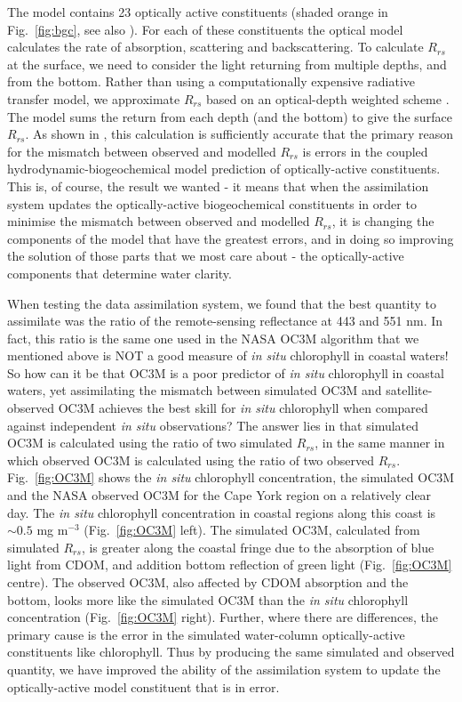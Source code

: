 The model contains 23 optically active constituents (shaded orange in Fig.~\ref{fig:bgc}, see also
\citet{Baird16a}). For each of these constituents the optical model calculates the rate of
absorption, scattering and backscattering. To calculate $R_{rs}$ at the surface, we need to consider
the light returning from multiple depths, and from the bottom. Rather than using a computationally
expensive radiative transfer model, we approximate $R_{rs}$ based on an optical-depth weighted
scheme \citep{Baird16a}. The model sums the return from each depth (and the bottom) to give the
surface $R_{rs}$. As shown in \citet{Baird16a}, this calculation is sufficiently accurate that the
primary reason for the mismatch between observed and modelled $R_{rs}$ is errors in the coupled
hydrodynamic-biogeochemical model prediction of optically-active constituents. This is, of course,
the result we wanted - it means that when the assimilation system updates the optically-active
biogeochemical constituents in order to minimise the mismatch between observed and modelled
$R_{rs}$, it is changing the components of the model that have the greatest errors, and in doing so
improving the solution of those parts that we most care about - the optically-active components that
determine water clarity.

When testing the data assimilation system, we found that the best quantity to assimilate was the
ratio of the remote-sensing reflectance at 443 and 551 nm. In fact, this ratio is the same one used
in the NASA OC3M algorithm that we mentioned above is NOT a good measure of \textit{in situ}
chlorophyll in coastal waters! So how can it be that OC3M is a poor predictor of \textit{in situ}
chlorophyll in coastal waters, yet assimilating the mismatch between simulated OC3M and
satellite-observed OC3M achieves the best skill for \textit{in situ} chlorophyll when compared
against independent \textit{in situ} observations? The answer lies in that simulated OC3M is
calculated using the ratio of two simulated $R_{rs}$, in the same manner in which observed OC3M is
calculated using the ratio of two observed $R_{rs}$. Fig.~\ref{fig:OC3M} shows the \textit{in situ}
chlorophyll concentration, the simulated OC3M and the NASA observed OC3M for the Cape York region on
a relatively clear day.  The \textit{in situ} chlorophyll concentration in coastal regions along
this coast is $\sim 0.5$ mg m$^{-3}$ (Fig.~\ref{fig:OC3M} left). The simulated OC3M, calculated from
simulated $R_{rs}$, is greater along the coastal fringe due to the absorption of blue light from
CDOM, and addition bottom reflection of green light (Fig.~\ref{fig:OC3M} centre). The observed OC3M,
also affected by CDOM absorption and the bottom, looks more like the simulated OC3M than the
\textit{in situ} chlorophyll concentration (Fig.~\ref{fig:OC3M} right). Further, where there are
differences, the primary cause is the error in the simulated water-column optically-active
constituents like chlorophyll. Thus by producing the same simulated and observed quantity, we have
improved the ability of the assimilation system to update the optically-active model constituent
that is in error.

